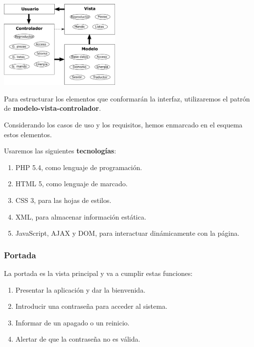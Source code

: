\documentclass[10pt,a4paper]{article}
\begin{document}
	\begin{multicols}{2}
		\noindent
		\begin{center}
			\includegraphics[width=0.45\textwidth]{images/mvc_completo} 
		\end{center}
		\columnbreak
		Para estructurar los elementos que conformarán la interfaz, utilizaremos el patrón de \textbf{modelo-vista-controlador}.
		
		Considerando los casos de uso y los requisitos, hemos enmarcado en el esquema estos elementos.
	\end{multicols}
	
	Usaremos las siguientes \textbf{tecnologías}:
	
	\begin{enumerate}
		\item PHP 5.4, como lenguaje de programación.
		\item HTML 5, como lenguaje de marcado.
		\item CSS 3, para las hojas de estilos.
		\item XML, para almacenar información estática.
		\item JavaScript, AJAX y DOM, para interactuar dinámicamente con la página.
	\end{enumerate}
	
	\subsubsection*{Portada}
	
	La portada es la vista principal y va a cumplir estas funciones:
	
	\begin{enumerate}
		\item Presentar la aplicación y dar la bienvenida.
		\item Introducir una contraseña para acceder al sistema.
		\item Informar de un apagado o un reinicio.
		\item Alertar de que la contraseña no es válida.
	\end{enumerate}
	
\end{document}
